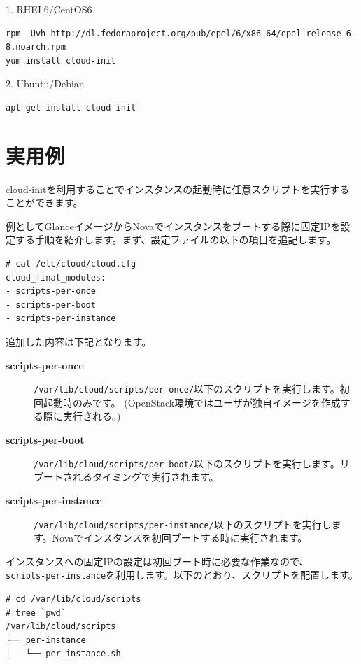\documentclass[9pt,b5paper,tombo,openany,dvipdfmx]{jsbook}
\begin{document}
1. RHEL6/CentOS6

\begin{lstlisting}
rpm -Uvh http://dl.fedoraproject.org/pub/epel/6/x86_64/epel-release-6-8.noarch.rpm
yum install cloud-init
\end{lstlisting}

2. Ubuntu/Debian

\begin{lstlisting}
apt-get install cloud-init
\end{lstlisting}

\section{実用例}

cloud-initを利用することでインスタンスの起動時に任意スクリプトを実行することができます。

例としてGlanceイメージからNovaでインスタンスをブートする際に固定IPを設定する手順を紹介します。まず、設定ファイルの以下の項目を追記します。

\begin{lstlisting}
# cat /etc/cloud/cloud.cfg
cloud_final_modules:
- scripts-per-once
- scripts-per-boot
- scripts-per-instance
\end{lstlisting}

追加した内容は下記となります。

\begin{description}
	\item[{\bfseries scripts-per-once}]\verb|/var/lib/cloud/scripts/per-once/|以下のスクリプトを実行します。初回起動時のみです。 (OpenStack環境ではユーザが独自イメージを作成する際に実行される。)
	\item[{\bfseries scripts-per-boot}]\verb|/var/lib/cloud/scripts/per-boot/|以下のスクリプトを実行します。リブートされるタイミングで実行されます。\item[{\bfseries scripts-per-instance}]\verb|/var/lib/cloud/scripts/per-instance/|以下のスクリプトを実行します。Novaでインスタンスを初回ブートする時に実行されます。
\end{description}

インスタンスへの固定IPの設定は初回ブート時に必要な作業なので、\\
\verb|scripts-per-instance|を利用します。以下のとおり、スクリプトを配置します。

\begin{verbatim}
# cd /var/lib/cloud/scripts
# tree `pwd`
/var/lib/cloud/scripts
├── per-instance
│   └── per-instance.sh
\end{verbatim}
\end{document}
